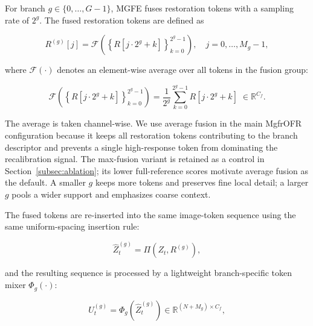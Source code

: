 For branch $g \in \{0,\ldots,G-1\}$, MGFE fuses restoration tokens with a sampling rate of $2^g$. The fused restoration tokens are defined as

\begin{equation}
R^{(g)}[j] =
\mathcal{F}\!\left(
\left\{R[j{\cdot}2^g+k]\right\}_{k=0}^{2^g-1}
\right),\quad
j = 0,\ldots,M_g-1,
\end{equation}

where $\mathcal{F}(\cdot)$ denotes an element-wise average over all tokens in the fusion group:

\begin{equation}
\mathcal{F}\!\left(
\left\{R[j\cdot2^g+k]\right\}_{k=0}^{2^g-1}
\right)
= \frac{1}{2^g}\sum_{k=0}^{2^g-1} R[j\cdot2^g+k]\;\in\mathbb{R}^{C_f}.
\label{eq:avg_fusion}
\end{equation}

The average is taken channel-wise. We use average fusion in the main MgfrOFR configuration because it keeps all restoration tokens contributing to the branch descriptor and prevents a single high-response token from dominating the recalibration signal. The max-fusion variant is retained as a control in Section~\ref{subsec:ablation}; its lower full-reference scores motivate average fusion as the default. A smaller $g$ keeps more tokens and preserves fine local detail; a larger $g$ pools a wider support and emphasizes coarse context.

The fused tokens are re-inserted into the same image-token sequence using the same uniform-spacing insertion rule:

\begin{equation}
\widehat{Z}_t^{(g)} = \Pi\!\left(Z_t,R^{(g)}\right),
\end{equation}

and the resulting sequence is processed by a lightweight branch-specific token mixer $\Phi_g(\cdot)$:

\begin{equation}
U_t^{(g)} = \Phi_g\!\left(\widehat{Z}_t^{(g)}\right)
\in \mathbb{R}^{(N+M_g)\times C_f},
\end{equation}

